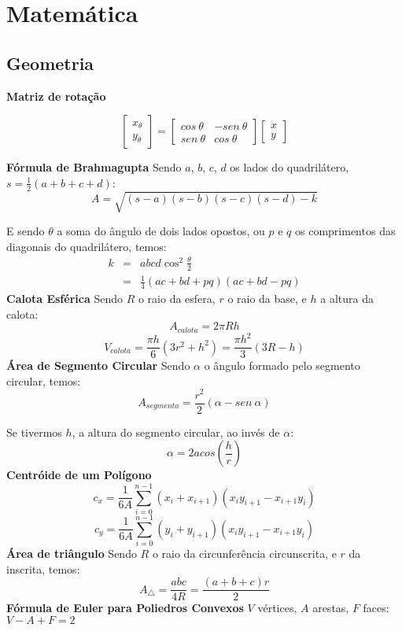 \normalsize
{}
\section{Matemática}

  \subsection{Geometria}
  {\bf Matriz de rotação}

  $$
  \left[\begin{array}{c}
      x_{\theta} \\
      y_{\theta}
    \end{array}\right] =
  \left[\begin{array}{rr}
      cos\ \theta  & -sen\ \theta \\
      sen\ \theta  & cos\ \theta
    \end{array}\right]
  \left[\begin{array}{c}
      x \\
      y
    \end{array}\right]
  $$

  {\bf Fórmula de Brahmagupta}
  Sendo $a$, $b$, $c$, $d$ os lados do quadrilátero, $s=\frac{1}{2}(a+b+c+d)$:
  $$
  A = \sqrt{(s-a)(s-b)(s-c)(s-d)-k}
  $$

  E sendo $\theta$ a soma do ângulo de dois lados opostos, ou $p$ e $q$ os comprimentos das diagonais do quadrilátero, temos:
  $$
  \begin{array}{rcl}
    k &=& abcd\cos^{2}\frac{\theta}{2} \\
    &=& \frac{1}{4}(ac+bd+pq)(ac+bd-pq)
  \end{array}
  $$
  {\bf Calota Esférica}
  Sendo $R$ o raio da esfera, $r$ o raio da base, e $h$ a altura da calota:
  $$
  A_{calota} = 2\pi Rh
  $$
  $$
  V_{calota} = \frac{\pi h}{6}\left( 3r^{2} + h^{2} \right) = \frac{\pi h^{2}}{3}\left( 3R - h \right)
  $$
  {\bf Área de Segmento Circular}
  Sendo $\alpha$ o ângulo formado pelo segmento circular, temos:
  $$
  A_{segmento} = \frac{r^{2}}{2} \left( \alpha - sen\ \alpha \right)
  $$

  Se tivermos $h$, a altura do segmento circular, ao invés de $\alpha$:
  $$
  \alpha = 2 acos\left( \frac{h}{r} \right)
  $$
  {\bf Centróide de um Polígono}
  $$
  c_{x} = \frac{1}{6A}\sum_{i=0}^{n-1} (x_{i} + x_{i+1})(x_{i}y_{i+1} - x_{i+1}y_{i})
  $$
  $$
  c_{y} = \frac{1}{6A}\sum_{i=0}^{n-1} (y_{i} + y_{i+1})(x_{i}y_{i+1} - x_{i+1}y_{i})
  $$
  {\bf Área de triângulo}
  Sendo $R$ o raio da circunferência circunscrita, e $r$ da inscrita, temos:
  $$
  A_{\triangle} = \frac{abc}{4R} = \frac{(a+b+c)r}{2}
  $$
  {\bf Fórmula de Euler para Poliedros Convexos}
  $V$ vértices, $A$ arestas, $F$ faces: $V - A + F = 2$
  
